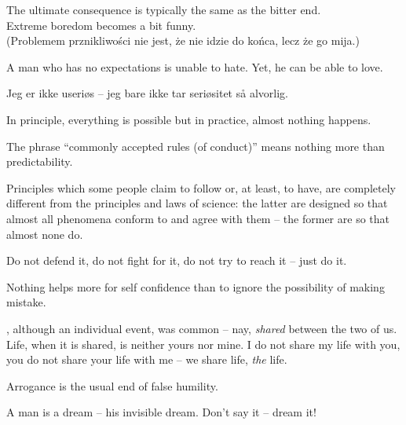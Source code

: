 \pa
The ultimate consequence is typically the same as the bitter end. \\
Extreme boredom becomes a bit funny.\\
(Problemem prznikliwo\'sci nie jest, \.ze nie idzie do ko\'nca, lecz \.ze 
go mija.)

\pa
A man who has no expectations is unable to hate. Yet, he can be able 
to love.

\pa
Jeg er ikke useri{\o}s -- jeg bare ikke tar seri{\o}sitet s{\aa} alvorlig.

\pa
In principle, everything is possible but in practice, almost nothing 
happens.

\pa 
The phrase ``commonly accepted rules (of conduct)'' means nothing more 
than predictability.

\pa
Principles which some people claim to follow or, at least, to have, 
are completely different from the principles and laws of science: the latter
are designed so that almost all phenomena conform to and agree with them -- the
former are so that almost none do.



\pa
Do not defend it, do not fight for it, do not try to reach it -- just do it.


\pa
Nothing helps more for self confidence than to ignore the possibility of 
making mistake.

\pa
{}, although an individual 
event, was common -- nay, {\em shared} between the two of us. Life, 
when it is shared, is neither yours nor mine. I do not share my life 
with you, you do not share your life with me -- we share life, {\em 
the} life.

\pa
Arrogance is the usual end of false humility.

\pa
A man is a dream -- his invisible dream. Don't say it -- dream it!


